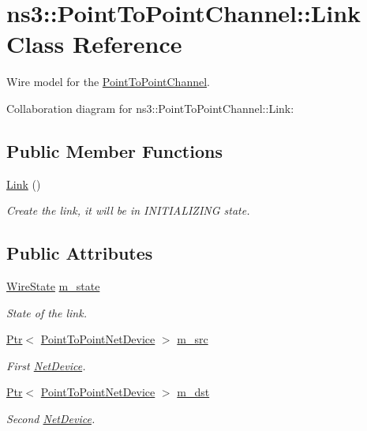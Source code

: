\hypertarget{classns3_1_1PointToPointChannel_1_1Link}{}\section{ns3\+:\+:Point\+To\+Point\+Channel\+:\+:Link Class Reference}
\label{classns3_1_1PointToPointChannel_1_1Link}


Wire model for the \hyperlink{classns3_1_1PointToPointChannel}{Point\+To\+Point\+Channel}.  




Collaboration diagram for ns3\+:\+:Point\+To\+Point\+Channel\+:\+:Link\+:
\subsection*{Public Member Functions}
\begin{DoxyCompactItemize}
\item 
\hyperlink{classns3_1_1PointToPointChannel_1_1Link_a31d1472c29cad22a96815bd5b3d2f534}{Link} ()
\begin{DoxyCompactList}\small\item\em Create the link, it will be in I\+N\+I\+T\+I\+A\+L\+I\+Z\+I\+NG state. \end{DoxyCompactList}\end{DoxyCompactItemize}
\subsection*{Public Attributes}
\begin{DoxyCompactItemize}
\item 
\hyperlink{classns3_1_1PointToPointChannel_a9baea8f4a74b839330bd7c7b0825a2a1}{Wire\+State} \hyperlink{classns3_1_1PointToPointChannel_1_1Link_afcd335f99bcc58b47e4790b5f1f85417}{m\+\_\+state}
\begin{DoxyCompactList}\small\item\em State of the link. \end{DoxyCompactList}\item 
\hyperlink{classns3_1_1Ptr}{Ptr}$<$ \hyperlink{classns3_1_1PointToPointNetDevice}{Point\+To\+Point\+Net\+Device} $>$ \hyperlink{classns3_1_1PointToPointChannel_1_1Link_ac0a88e6470a4c34eddc66de5d294c938}{m\+\_\+src}
\begin{DoxyCompactList}\small\item\em First \hyperlink{classns3_1_1NetDevice}{Net\+Device}. \end{DoxyCompactList}\item 
\hyperlink{classns3_1_1Ptr}{Ptr}$<$ \hyperlink{classns3_1_1PointToPointNetDevice}{Point\+To\+Point\+Net\+Device} $>$ \hyperlink{classns3_1_1PointToPointChannel_1_1Link_a3451cdfb5789678875b195b459459274}{m\+\_\+dst}
\begin{DoxyCompactList}\small\item\em Second \hyperlink{classns3_1_1NetDevice}{Net\+Device}. \end{DoxyCompactList}\end{DoxyCompactItemize}


